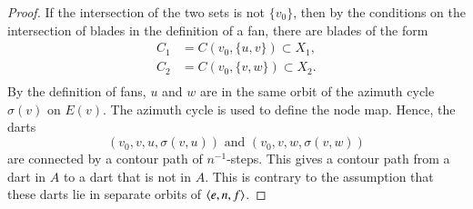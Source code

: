\begin{proof} 
If the intersection of the two sets is not $\{v_0\}$, then
by the conditions on the intersection of blades in the definition
of a fan,
there are blades of the form
  $$
  \begin{array}{lll}
   C_1 &= C(v_0,\{u,v\})\subset X_1,\\
   C_2 &= C(v_0,\{v,w\})\subset X_2.\\
  \end{array}
  $$
By the definition of fans, $u$ and $w$ are
in the same orbit of the azimuth cycle $\sigma(v)$ on $E(v)$.
The azimuth cycle is used to define the node map.
Hence, the darts 
   $$
   (v_0,v,u,\sigma(v,u)) \text{ and }
   (v_0,v,w,\sigma(v,w))
   $$
are connected by a contour path of $n^{-1}$-steps.
This gives a contour path from a dart in $A$ to a dart that
is not in $A$.
This is contrary to the assumption that these darts lie in
separate orbits of $\langle e,n,f\rangle$.
\end{proof}



